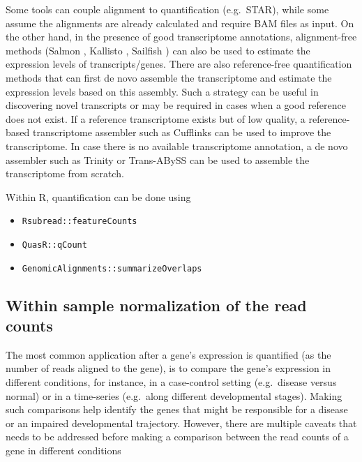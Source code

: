 \documentclass[12pt,]{krantz}
\providecommand{\tightlist}{%
  \setlength{\itemsep}{0pt}\setlength{\parskip}{0pt}}
\begin{document}
Some tools can couple alignment to quantification (e.g.~STAR), while some assume the alignments are already calculated and require BAM files as input. On the other hand, in the presence of good transcriptome annotations, alignment-free methods (Salmon \citep{patro_salmon:_2017}, Kallisto \citep{bray_near-optimal_2016}, Sailfish \citep{patro_sailfish_2014}) can also be used to estimate the expression levels of transcripts/genes. There are also reference-free quantification methods that can first de novo assemble the transcriptome and estimate the expression levels based on this assembly. Such a strategy can be useful in discovering novel transcripts or may be required in cases when a good reference does not exist. If a reference transcriptome exists but of low quality, a reference-based transcriptome assembler such as Cufflinks \citep{trapnell_transcript_2010} can be used to improve the transcriptome. In case there is no available transcriptome annotation, a de novo assembler such as Trinity \citep{haas_novo_2013} or Trans-ABySS \citep{robertson_novo_2010} can be used to assemble the transcriptome from scratch.

Within R, quantification can be done using

\begin{itemize}
\tightlist
\item
  \texttt{Rsubread::featureCounts}
\item
  \texttt{QuasR::qCount}
\item
  \texttt{GenomicAlignments::summarizeOverlaps}
\end{itemize}

\hypertarget{within-sample-normalization-of-the-read-counts}{%
\subsection{Within sample normalization of the read counts}\label{within-sample-normalization-of-the-read-counts}}

The most common application after a gene's expression is quantified (as the number of reads aligned to the gene), is to compare the gene's expression in different conditions, for instance, in a case-control setting (e.g.~disease versus normal) or in a time-series (e.g.~along different developmental stages). Making such comparisons help identify the genes that might be responsible for a disease or an impaired developmental trajectory. However, there are multiple caveats that needs to be addressed before making a comparison between the read counts of a gene in different conditions \citep{maza_comparison_2013}
\end{document}
